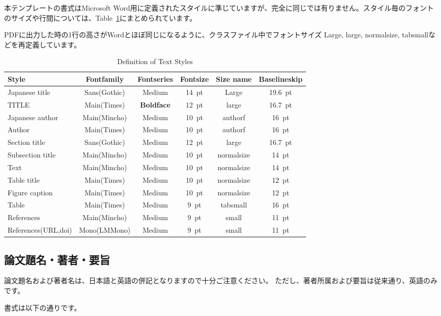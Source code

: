 \documentclass{PASJ2026}
\begin{document}
本テンプレートの書式はMicrosoft Word用に定義されたスタイルに準じていますが、完全に同じでは有りません。スタイル毎のフォントのサイズや行間については、Table~\ref{Tab2}にまとめられています。

PDFに出力した時の1行の高さがWordとほぼ同じになるように、クラスファイル中でフォントサイズ Large, large, normalsize, tabsmallなどを再定義しています。
%
\begin{table}[hbt]
\centering
\caption{Definition of Text Styles}
\begin{tabsmall}
\begin{tabular}{lccccc}
\toprule
 Style & Fontfamily &  Fontseries & Fontsize & Size name & Baselineskip\\
\midrule
Japanese title & Sans(Gothic) & Medium & 14~pt & Large & 19.6~pt\\
TITLE & Main(Times) & {\textbf{Boldface}} & 12~pt & large & 16.7~pt\\
Japanese author & Main(Mincho) & Medium & 10~pt & authorf & 16~pt\\
Author & Main(Times) & Medium & 10~pt & authorf & 16~pt\\
Section title & Sans(Gothic) & Medium & 12~pt & large & 16.7~pt\\
Subsection title & Main(Mincho) & Medium & 10~pt & normalsize & 14~pt\\
Text & Main(Mincho) & Medium & 10~pt & normalsize & 14~pt\\
Table title & Main(Times) & Medium & 10~pt & normalsize & 12~pt\\ 
Figure caption & Main(Times) & Medium & 10~pt & normalsize & 12~pt\\ 
Table & Main(Times) & Medium & 9~pt & tabsmall & 16~pt\\
References & Main(Mincho) & Medium & 9~pt & small & 11~pt\\
References(URL,doi) & Mono(LMMono) & Medium & 9~pt & small & 11~pt\\
\bottomrule
\end{tabular}
\end{tabsmall}
\label{Tab2}
\end{table}
%
\subsection{論文題名・著者・要旨}
論文題名および著者名は、日本語と英語の併記となりますので十分ご注意ください。
ただし、著者所属および要旨は従来通り、英語のみです。

書式は以下の通りです。
\end{document}
